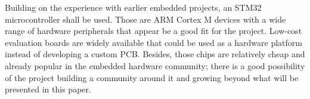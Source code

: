 Building on the experience with earlier embedded projects, an STM32 microcontroller shall be used. Those are ARM Cortex M devices with a wide range of hardware peripherals that appear be a good fit for the project. Low-cost evaluation boards are widely available that could be used as a hardware platform instead of developing a custom \gls{PCB}. Besides, those chips are relatively cheap and already popular in the embedded hardware community; there is a good possibility of the project building a community around it and growing beyond what will be presented in this paper.

